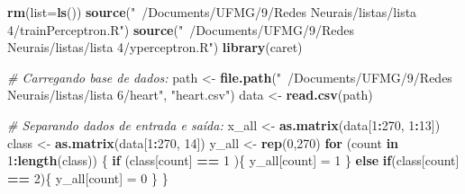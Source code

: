 \documentclass[
]{article}
\newenvironment{Shaded}{\begin{snugshade}}{\end{snugshade}}
\newcommand{\CommentTok}[1]{\textcolor[rgb]{0.56,0.35,0.01}{\textit{#1}}}
\newcommand{\ControlFlowTok}[1]{\textcolor[rgb]{0.13,0.29,0.53}{\textbf{#1}}}
\newcommand{\DataTypeTok}[1]{\textcolor[rgb]{0.13,0.29,0.53}{#1}}
\newcommand{\DecValTok}[1]{\textcolor[rgb]{0.00,0.00,0.81}{#1}}
\newcommand{\KeywordTok}[1]{\textcolor[rgb]{0.13,0.29,0.53}{\textbf{#1}}}
\newcommand{\NormalTok}[1]{#1}
\newcommand{\OperatorTok}[1]{\textcolor[rgb]{0.81,0.36,0.00}{\textbf{#1}}}
\newcommand{\StringTok}[1]{\textcolor[rgb]{0.31,0.60,0.02}{#1}}
\begin{document}
\begin{Shaded}
\begin{Highlighting}[]
\KeywordTok{rm}\NormalTok{(}\DataTypeTok{list=}\KeywordTok{ls}\NormalTok{())}
\KeywordTok{source}\NormalTok{(}\StringTok{"~/Documents/UFMG/9/Redes Neurais/listas/lista 4/trainPerceptron.R"}\NormalTok{)}
\KeywordTok{source}\NormalTok{(}\StringTok{"~/Documents/UFMG/9/Redes Neurais/listas/lista 4/yperceptron.R"}\NormalTok{)}
\KeywordTok{library}\NormalTok{(caret)}

\CommentTok{# Carregando base de dados:}
\NormalTok{path <-}\StringTok{ }\KeywordTok{file.path}\NormalTok{(}\StringTok{"~/Documents/UFMG/9/Redes Neurais/listas/lista 6/heart"}\NormalTok{, }\StringTok{"heart.csv"}\NormalTok{)}
\NormalTok{data <-}\StringTok{ }\KeywordTok{read.csv}\NormalTok{(path)}

\CommentTok{# Separando dados de entrada e saída:}
\NormalTok{x_all <-}\StringTok{ }\KeywordTok{as.matrix}\NormalTok{(data[}\DecValTok{1}\OperatorTok{:}\DecValTok{270}\NormalTok{, }\DecValTok{1}\OperatorTok{:}\DecValTok{13}\NormalTok{])}
\NormalTok{class <-}\StringTok{ }\KeywordTok{as.matrix}\NormalTok{(data[}\DecValTok{1}\OperatorTok{:}\DecValTok{270}\NormalTok{, }\DecValTok{14}\NormalTok{])}
\NormalTok{y_all <-}\StringTok{ }\KeywordTok{rep}\NormalTok{(}\DecValTok{0}\NormalTok{,}\DecValTok{270}\NormalTok{)}
\ControlFlowTok{for}\NormalTok{ (count }\ControlFlowTok{in} \DecValTok{1}\OperatorTok{:}\KeywordTok{length}\NormalTok{(class)) \{}
  \ControlFlowTok{if}\NormalTok{ (class[count] }\OperatorTok{==}\StringTok{ }\DecValTok{1}\NormalTok{ )\{}
\NormalTok{    y_all[count] =}\StringTok{ }\DecValTok{1}
\NormalTok{  \}}
  \ControlFlowTok{else} \ControlFlowTok{if}\NormalTok{(class[count] }\OperatorTok{==}\StringTok{ }\DecValTok{2}\NormalTok{)\{}
\NormalTok{    y_all[count] =}\StringTok{ }\DecValTok{0}
\NormalTok{  \}}
\NormalTok{\}}


\end{Highlighting}
\end{Shaded}
\end{document}
